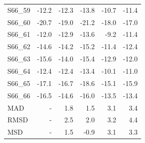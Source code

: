 \begin{longtable}{lrrrrr}
S66\_59 & -12.2 & -12.3 & -13.8 & -10.7 & -11.4 \\
S66\_60 & -20.7 & -19.0 & -21.2 & -18.0 & -17.0 \\
S66\_61 & -12.0 & -12.9 & -13.6 & -9.2 & -11.4 \\
S66\_62 & -14.6 & -14.2 & -15.2 & -11.4 & -12.4 \\
S66\_63 & -15.6 & -14.0 & -15.4 & -12.9 & -12.0 \\
S66\_64 & -12.4 & -12.4 & -13.4 & -10.1 & -11.0 \\
S66\_65 & -17.1 & -16.7 & -18.6 & -15.1 & -15.9 \\
S66\_66 & -16.5 & -14.6 & -16.0 & -13.5 & -13.4 \\
MAD & - & 1.8 & 1.5 & 3.1 & 3.4 \\
RMSD & - & 2.5 & 2.0 & 3.2 & 4.4 \\
MSD & - & 1.5 & -0.9 & 3.1 & 3.3 \\
\bottomrule
\end{longtable}